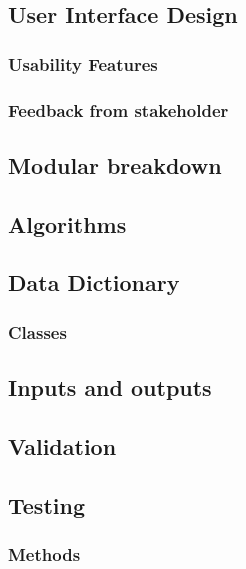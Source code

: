 \documentclass[11pt,a4paper]{article}
\begin{document}
\subsection{User Interface Design}

\subsubsection{Usability Features}

\subsubsection{Feedback from stakeholder}

\subsection{Modular breakdown}


\subsection{Algorithms}


\subsection{Data Dictionary}

\subsubsection{Classes}

\subsection{Inputs and outputs}

\subsection{Validation}

\subsection{Testing}

\subsubsection{Methods}
\end{document}

